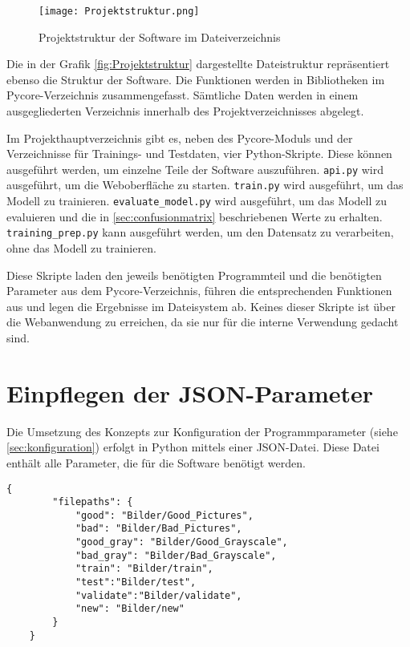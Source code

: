 \begin{figure}[H]
    \centering
    \texttt{[image: Projektstruktur.png]}
    \caption{Projektstruktur der Software im Dateiverzeichnis}
    \label{fig:Projektstruktur}
\end{figure}

Die in der Grafik \autoref{fig:Projektstruktur} dargestellte Dateistruktur repräsentiert ebenso die Struktur der Software. Die Funktionen werden in Bibliotheken im Pycore-Verzeichnis zusammengefasst. 
Sämtliche Daten werden in einem ausgegliederten Verzeichnis innerhalb des Projektverzeichnisses abgelegt. 

Im Projekthauptverzeichnis gibt es, neben des Pycore-Moduls und der Verzeichnisse für Trainings- und Testdaten, vier Python-Skripte. Diese können ausgeführt werden, um einzelne Teile der Software auszuführen.
\texttt{api.py} wird ausgeführt, um die Weboberfläche zu starten.
\texttt{train.py} wird ausgeführt, um das Modell zu trainieren.
\texttt{evaluate\_model.py} wird ausgeführt, um das Modell zu evaluieren und die in \autoref{sec:confusionmatrix} beschriebenen Werte zu erhalten. 
\texttt{training\_prep.py} kann ausgeführt werden, um den Datensatz zu verarbeiten, ohne das Modell zu trainieren.

Diese Skripte laden den jeweils benötigten Programmteil und die benötigten Parameter aus dem Pycore-Verzeichnis, führen die entsprechenden Funktionen aus und legen die Ergebnisse im Dateisystem ab.
Keines dieser Skripte ist über die Webanwendung zu erreichen, da sie nur für die interne Verwendung gedacht sind.

\section{Einpflegen der JSON-Parameter} \label{subsec:json_parameter}

Die Umsetzung des Konzepts zur Konfiguration der Programmparameter (siehe \autoref{sec:konfiguration}) erfolgt in Python mittels einer \ac{JSON}-Datei.
Diese Datei enthält alle Parameter, die für die Software benötigt werden.

\begin{lstlisting}[style=json, label=lst:json_example, caption={Beispiel einer \ac{JSON}-Datei mit Parametern des mobilnet Modells}]
    {
        "filepaths": {
            "good": "Bilder/Good_Pictures",
            "bad": "Bilder/Bad_Pictures",
            "good_gray": "Bilder/Good_Grayscale",
            "bad_gray": "Bilder/Bad_Grayscale",
            "train": "Bilder/train",
            "test":"Bilder/test",
            "validate":"Bilder/validate",
            "new": "Bilder/new"
        }
    }
\end{lstlisting}

